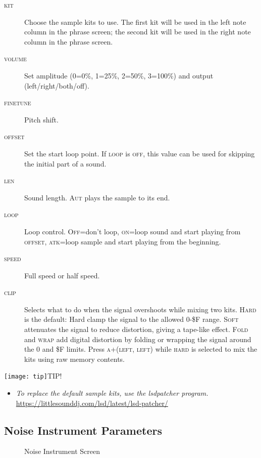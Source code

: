 \begin{description}
	\item[\textsc{kit}] Choose the sample kits to use. The first kit will be used in the left note column in the phrase screen; the second kit will be used in the right note column in the phrase screen.
    \item[\textsc{volume}] Set amplitude (0=0\%, 1=25\%, 2=50\%, 3=100\%) and output (left/right/both/off).
	\item[\textsc{finetune}] Pitch shift.
	\item[\textsc{offset}] Set the start loop point. If \textsc{loop} is \textsc{off}, this value can be used for skipping the initial part of a sound.
	\item[\textsc{len}] Sound length. \textsc{Aut} plays the sample to its end.
	\item[\textsc{loop}] Loop control. \textsc{Off}=don't loop, \textsc{on}=loop sound and start playing from \textsc{offset}, \textsc{atk}=loop sample and start playing from the beginning.
	\item[\textsc{speed}] Full speed or half speed.
	\item[\textsc{clip}] Selects what to do when the signal overshoots while mixing two kits. \textsc{Hard} is the default: Hard clamp the signal to the allowed 0-\$F range. \textsc{Soft} attenuates the signal to reduce distortion, giving a tape-like effect. \textsc{Fold} and \textsc{wrap} add digital distortion by folding or wrapping the signal around the 0 and \$F limits. Press \textsc{a+(left, left)} while \textsc{hard} is selected to mix the kits using raw memory contents.
\end{description}

\texttt{[image: tip]}TIP!
\begin{itemize}
\item \textit{To replace the default sample kits, use the lsdpatcher program.} \url{https://littlesounddj.com/lsd/latest/lsd-patcher/}
\end{itemize}

\subsection{Noise Instrument Parameters}
\label{noise-instrument-parameters}

\begin{figure}[htpb]
	\begin{center}
	\end{center}
	\caption{Noise Instrument Screen}
	\label{fig:instr-noise}
\end{figure}

